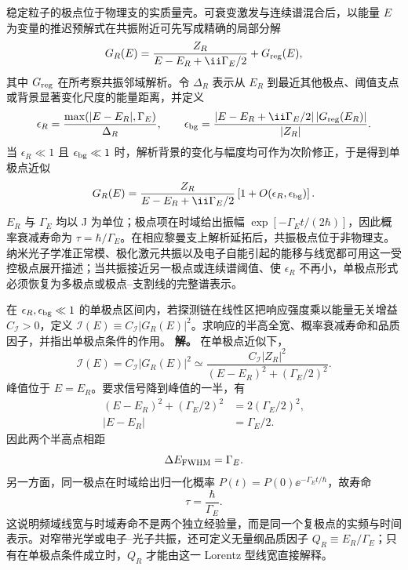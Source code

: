 稳定粒子的极点位于物理支的实质量壳。可衰变激发与连续谱混合后，以能量 $E$ 为变量的推迟预解式在共振附近可先写成精确的局部分解
\begin{equation*}
 G_R(E)
 =\frac{Z_R}{E-E_R+\ii\Gamma_E/2}+G_{\rm reg}(E),
\end{equation*}
其中 $G_{\rm reg}$ 在所考察共振邻域解析。令 $\Delta_R$ 表示从 $E_R$ 到最近其他极点、阈值支点或背景显著变化尺度的能量距离，并定义
\begin{equation*}
 \epsilon_R
 =\frac{\max(|E-E_R|,\Gamma_E)}{\Delta_R},
 \qquad
 \epsilon_{\rm bg}
 =\frac{|E-E_R+\ii\Gamma_E/2|\,|G_{\rm reg}(E_R)|}{|Z_R|}.
\end{equation*}
当 $\epsilon_R\ll1$ 且 $\epsilon_{\rm bg}\ll1$ 时，解析背景的变化与幅度均可作为次阶修正，于是得到单极点近似
\begin{equation}
 {
 G_R(E)
 =\frac{Z_R}{E-E_R+\ii\Gamma_E/2}
 \left[1+O(\epsilon_R,\epsilon_{\rm bg})\right].}
 \label{eq:resonance-pole-SI-r12}
\end{equation}
$E_R$ 与 $\Gamma_E$ 均以 J 为单位；极点项在时域给出振幅 $\exp[-\Gamma_E t/(2\hbar)]$，因此概率衰减寿命为 $\tau=\hbar/\Gamma_E$。在相应黎曼支上解析延拓后，共振极点位于非物理支。纳米光子学准正常模、极化激元共振以及电子自能引起的能移与线宽都可用这一受控极点展开描述；当共振接近另一极点或连续谱阈值、使 $\epsilon_R$ 不再小，单极点形式必须恢复为多极点或极点--支割线的完整谱表示。

\begin{exbox}[由共振极点直接读出线宽与寿命]
在 $\epsilon_R,\epsilon_{\rm bg}\ll1$ 的单极点区间内，若探测链在线性区把响应强度乘以能量无关增益 $C_{\mathcal I}>0$，定义 $\mathcal I(E)\equiv C_{\mathcal I}|G_R(E)|^2$。求响应的半高全宽、概率衰减寿命和品质因子，并指出单极点条件的作用。
\textbf{解。} 在单极点近似下，
\begin{equation}
 \mathcal I(E)
 =C_{\mathcal I}|G_R(E)|^2
 \simeq
 \frac{C_{\mathcal I}|Z_R|^2}{(E-E_R)^2+(\Gamma_E/2)^2}.
 \label{eq:resonance-lorentzian-example-dp48}
\end{equation}
峰值位于 $E=E_R$。要求信号降到峰值的一半，有
\begin{align*}
 (E-E_R)^2+(\Gamma_E/2)^2
 &=2(\Gamma_E/2)^2,\\
 |E-E_R|&=\Gamma_E/2.
\end{align*}
因此两个半高点相距
\begin{equation*}
 \Delta E_{\rm FWHM}=\Gamma_E.
\end{equation*}
另一方面，同一极点在时域给出归一化概率
$P(t)=P(0)\ee^{-\Gamma_E t/\hbar}$，故寿命
\begin{equation*}
 \tau=\frac{\hbar}{\Gamma_E}.
\end{equation*}
这说明频域线宽与时域寿命不是两个独立经验量，而是同一个复极点的实频与时间表示。对窄带光学或电子--光子共振，还可定义无量纲品质因子 $Q_R\equiv E_R/\Gamma_E$；只有在单极点条件成立时，$Q_R$ 才能由这一 Lorentz 型线宽直接解释。
\end{exbox}



